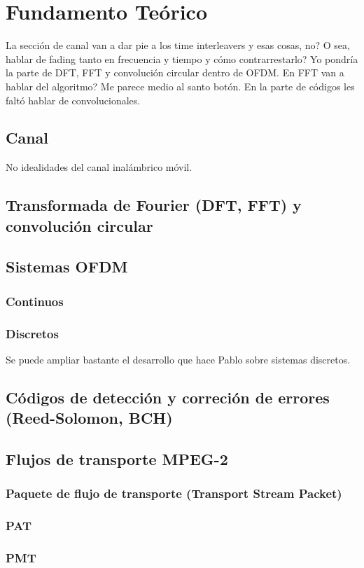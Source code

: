 \chapter{Fundamento Teórico}

La sección de canal van a dar pie a los time interleavers y esas cosas, no? O sea, hablar de fading tanto en frecuencia y tiempo y cómo contrarrestarlo?
Yo pondría la parte de DFT, FFT y convolución circular dentro de OFDM. En FFT van a hablar del algoritmo? Me parece medio al santo botón.
En la parte de códigos les faltó hablar de convolucionales.

\section{Canal}
No idealidades del canal inalámbrico móvil.

\section{Transformada de Fourier (DFT, FFT) y convolución circular}

\section{Sistemas OFDM}

\subsection{Continuos}

\subsection{Discretos}
Se puede ampliar bastante el desarrollo que hace Pablo sobre sistemas discretos. 

\section{Códigos de detección y correción de errores (Reed-Solomon, BCH)}


\section{Flujos de transporte MPEG-2}
\subsection{Paquete de flujo de transporte (Transport Stream Packet)}
\subsection{PAT}
\subsection{PMT}

